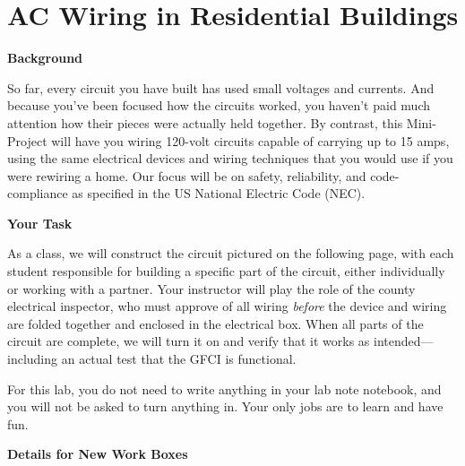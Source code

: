 \section{AC Wiring in Residential Buildings}
\label{lab_building_wiring}



\bigskip

\textbf{Background}

So far, every circuit you have built has used small voltages and currents.  And because you've been focused how the circuits worked, you haven't paid much attention how their pieces were actually held together.  By contrast, this Mini-Project will have you wiring 120-volt circuits capable of carrying up to 15 amps, using the same electrical devices and wiring techniques that you would use if you were rewiring a home.  Our focus will be on safety, reliability, and code-compliance as specified in the US National Electric Code (NEC).

\bigskip
\textbf{Your Task}

As a class, we will construct the circuit pictured on the following page, with each student responsible for building a specific part of the circuit, either individually or working with a partner.  Your instructor will play the role of the county electrical inspector, who must approve of all wiring \textit{before} the device and wiring are folded together and enclosed in the electrical box.  When all parts of the circuit are complete, we will turn it on and verify that it works as intended---including an actual test that the GFCI is functional.

For this lab, you do not need to write anything in your lab note notebook, and you will not be asked to turn anything in.  Your only jobs are to learn and have fun.


\bigskip
\textbf{Details for New Work Boxes}

